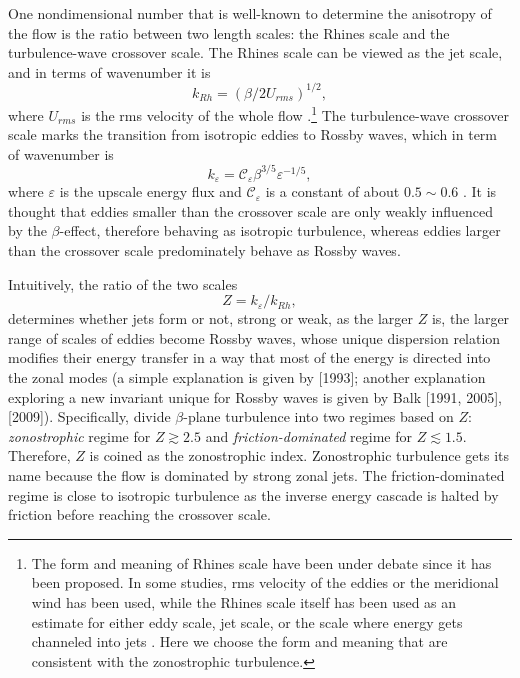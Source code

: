 \documentclass{ametsoc}
\begin{document}
One nondimensional number that is well-known to determine the anisotropy
of the flow is the ratio between two length scales: the Rhines scale
and the turbulence-wave crossover scale. The Rhines scale
can be viewed as the jet scale, and in terms of wavenumber it is
\begin{equation}
    k_{Rh}=(\beta/2U_{rms})^{1/2},\label{eq:Rhines_wavenumber_beta_Urms}
\end{equation}
where $U_{rms}$ is the rms velocity of the whole flow \citep{Rhines1975}.\footnote{
The form and meaning of Rhines scale have been
under debate since it has been proposed. In some studies, rms velocity
of the eddies or the meridional wind has been used, while the Rhines scale itself
has been used as an estimate for either eddy scale, jet scale, or
the scale where energy gets channeled into jets \citep{Williams1978,Jansen2012,Chai2014,Liu2015,Chemke2015}.
Here we choose the form and meaning that are consistent 
with the zonostrophic turbulence.}
The turbulence-wave crossover scale marks the transition from
isotropic eddies to Rossby waves, which in term of wavenumber is
\begin{equation}
    k_{\varepsilon}=\mathcal{C}_{\varepsilon}\beta^{3/5}\varepsilon^{-1/5},\label{eq:classical_crossover_wavenumber}
\end{equation}
where $\varepsilon$ is the upscale energy flux and $\mathcal{C}_{\varepsilon}$ is a constant of about
$0.5\sim0.6$ \citep{Vallis1993,Galperin2010,Smith2002}. It is thought that
eddies smaller than the crossover scale are only weakly influenced by the 
$\beta$-effect, therefore behaving as isotropic turbulence, whereas eddies 
larger than the crossover scale predominately behave as Rossby waves.

Intuitively, the ratio of the two scales
\begin{equation}
    Z=k_{\varepsilon}/k_{Rh},\label{eq:zonostrophic_index_def}
\end{equation}
determines whether jets form or not, strong or weak, as the larger
$Z$ is, the larger range of scales of eddies become Rossby waves, whose
unique dispersion relation modifies their energy transfer in a way 
that most of the energy is directed into the zonal modes (a simple explanation 
is given by \citeauthor{Vallis1993}
{[}1993{]}; another explanation exploring a new invariant unique for
Rossby waves is given by \nocite{Balk1991,Balk2005}Balk {[}1991,
2005{]}, \citeauthor{Nazarenko2009} {[}2009{]}).
Specifically, \citet{Galperin2010}
divide $\beta$-plane turbulence into two regimes based on $Z$: 
\textit{zonostrophic} regime for $Z\gtrsim2.5$ and 
\textit{friction-dominated} regime for $Z\lesssim1.5$. 
Therefore, $Z$ is coined as the zonostrophic index. 
Zonostrophic turbulence gets its name because the flow
is dominated by strong zonal jets. The friction-dominated
regime is close to isotropic turbulence as the inverse energy cascade
is halted by friction before reaching the crossover scale.
\end{document}
